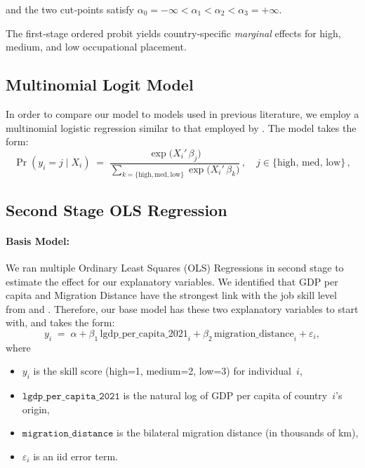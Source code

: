 \documentclass[12pt, a4paper]{article}
\begin{document}
and the two cut‐points satisfy 
\(\alpha_0=-\infty<\alpha_1<\alpha_2<\alpha_3=+\infty\).

The first‐stage ordered probit yields country‐specific \emph{marginal} effects for high, medium, and low occupational placement. 


\subsection{Multinomial Logit Model}

In order to compare our model to models used in previous literature, we employ a multinomial logistic regression similar to that employed by \citet{MattooBrainWaste}. The model takes the form:
\begin{equation}\label{eq:mlogit}
  \Pr(y_i = j \mid X_i)
  \;=\;
  \frac{\exp\bigl(X_i'\,\beta_j \bigr)}%
       {\sum_{k=\{\text{high},\text{med},\text{low}\}}
              \exp\bigl(X_i'\,\beta_k\bigr)}\,,
  \quad j\in\{\text{high},\,\text{med},\,\text{low}\}\,,
\end{equation}


\subsection{Second Stage OLS Regression}

\paragraph{Basis Model:}
We ran multiple Ordinary Least Squares (OLS) Regressions in second stage to estimate the effect for our explanatory variables. We identified that GDP per capita and Migration Distance have the strongest link with the job skill level from \citet{BorjasSelfSelection} and \citet{MattooBrainWaste}. Therefore, our base model has these two explanatory variables to start with, and takes the form: 
\begin{equation}\label{eq:ols-base}
  y_i
  \;=\;
  \alpha
  + \beta_{1}\,\text{lgdp\_per\_capita\_2021}_i
  + \beta_{2}\,\text{migration\_distance}_i
  + \varepsilon_i,
\end{equation}
where
\begin{itemize}
  \item $y_i$ is the skill score (high=1, medium=2, low=3) for individual~$i$,
  \item $\texttt{lgdp\_per\_capita\_2021}$ is the natural log of GDP per capita of country~$i$’s origin,
  \item $\texttt{migration\_distance}$ is the bilateral migration distance (in thousands of km),
  \item $\varepsilon_i$ is an iid error term.
\end{itemize}
\end{document}
